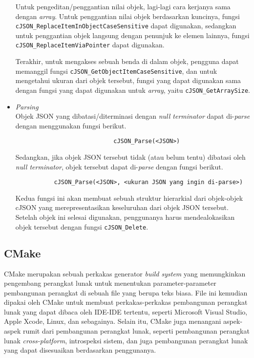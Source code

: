 \begin{itemize}[listparindent=\parindent]
	Untuk pengeditan/penggantian nilai objek, lagi-lagi cara kerjanya sama dengan \textit{array}. \mbox{Untuk} penggantian nilai objek berdasarkan kuncinya, fungsi \verb|cJSON_ReplaceItemInObject|\linebreak \verb|CaseSensitive| dapat digunakan, sedangkan untuk penggantian objek langsung dengan penunjuk ke elemen lainnya, fungsi \verb|cJSON_ReplaceItemViaPointer| dapat digunakan.

	Terakhir, untuk mengakses sebuah benda di dalam objek, pengguna dapat memanggil fungsi \verb|cJSON_GetObjectItemCaseSensitive|, dan untuk mengetahui ukuran dari objek tersebut, fungsi yang dapat digunakan sama dengan fungsi yang dapat digunakan untuk \textit{array}, yaitu \verb|cJSON_GetArraySize|.

	\item \textit{Parsing}\\
	Objek JSON yang dibatasi/diterminasi dengan \textit{null terminator} dapat di-\textit{parse} dengan \mbox{menggunakan} fungsi berikut.
	
	\begin{verbatim}
                            cJSON_Parse(<JSON>)
	\end{verbatim}
	\noindent
	Sedangkan, jika objek JSON tersebut tidak (atau belum tentu) dibatasi oleh \textit{null terminator}, objek tersebut dapat di-\textit{parse} dengan fungsi berikut.
	
	\begin{verbatim}
           cJSON_Parse(<JSON>, <ukuran JSON yang ingin di-parse>)
	\end{verbatim}
	\noindent
	Kedua fungsi ini akan membuat sebuah struktur hierarkial dari objek-objek cJSON yang merepresentasikan keseluruhan dari objek JSON tersebut. Setelah objek ini selesai digunakan, penggunanya harus mendealokasikan objek tersebut dengan fungsi \verb|cJSON_Delete|.
\end{itemize}

\subsection{CMake \cite{kitware:2022:masteringcmake}}
\label{sec:cmodules-CMake}

CMake merupakan sebuah perkakas generator \textit{build system} yang memungkinkan pengembang perangkat lunak untuk menentukan parameter-parameter pembangunan perangkat di sebuah file yang berupa teks biasa. File ini kemudian dipakai oleh CMake untuk membuat perkakas-perkakas pembangunan perangkat lunak yang dapat dibaca oleh IDE-IDE tertentu, seperti Microsoft Visual Studio, Apple Xcode, Linux, dan sebagainya. Selain itu, CMake juga menangani aspek-aspek rumit dari pembangunan perangkat lunak, seperti pembangunan perangkat lunak \textit{cross-platform}, introspeksi sistem, dan juga pembangunan perangkat lunak yang dapat disesuaikan berdasarkan penggunanya.

